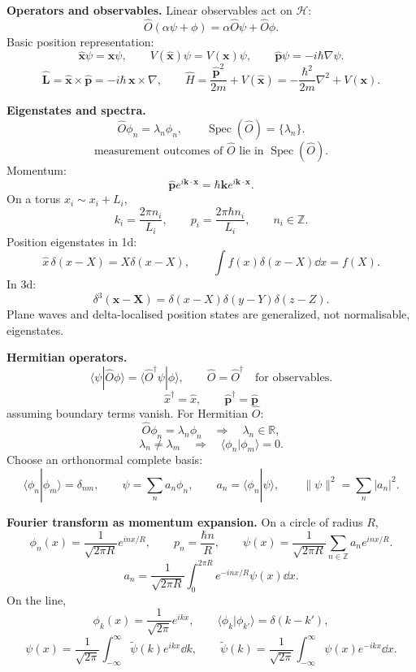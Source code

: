 \noindent\textbf{Operators and observables.}
Linear observables act on \(\mathcal{H}\):
\[
\hat O(\alpha\psi+\phi)=\alpha\hat O\psi+\hat O\phi.
\]
Basic position representation:
\[
\hat{\mathbf{x}}\psi=\mathbf{x}\psi,\qquad
V(\hat{\mathbf{x}})\psi=V(\mathbf{x})\psi,\qquad
\hat{\mathbf{p}}\psi=-i\hbar\nabla\psi.
\]
\[
\hat{\mathbf{L}}=\hat{\mathbf{x}}\times\hat{\mathbf{p}}
=-i\hbar\,\mathbf{x}\times\nabla,\qquad
\hat H=\frac{\hat{\mathbf{p}}^2}{2m}+V(\hat{\mathbf{x}})
=-\frac{\hbar^2}{2m}\nabla^2+V(\mathbf{x}).
\]

\noindent\textbf{Eigenstates and spectra.}
\[
\hat O\phi_n=\lambda_n\phi_n,\qquad
\operatorname{Spec}(\hat O)=\{\lambda_n\}.
\]
\[
\boxed{\text{measurement outcomes of }\hat O\text{ lie in }\operatorname{Spec}(\hat O)}.
\]
Momentum:
\[
\hat{\mathbf{p}}e^{i\mathbf{k}\cdot\mathbf{x}}
=\hbar\mathbf{k}e^{i\mathbf{k}\cdot\mathbf{x}}.
\]
On a torus \(x_i\sim x_i+L_i\),
\[
k_i=\frac{2\pi n_i}{L_i},\qquad p_i=\frac{2\pi\hbar n_i}{L_i},\qquad n_i\in\mathbb{Z}.
\]
Position eigenstates in 1d:
\[
\hat x\,\delta(x-X)=X\delta(x-X),\qquad
\int f(x)\delta(x-X)\dd x=f(X).
\]
In 3d:
\[
\delta^3(\mathbf{x}-\mathbf{X})
=\delta(x-X)\delta(y-Y)\delta(z-Z).
\]
Plane waves and delta-localised position states are generalized, not normalisable,
eigenstates.

\noindent\textbf{Hermitian operators.}
\[
\langle\psi|\hat O\phi\rangle=\langle\hat O^\dagger\psi|\phi\rangle,\qquad
\hat O=\hat O^\dagger\quad\text{for observables}.
\]
\[
\hat x^\dagger=\hat x,\qquad
\hat{\mathbf{p}}^\dagger=\hat{\mathbf{p}}
\]
assuming boundary terms vanish. For Hermitian \(\hat O\):
\[
\hat O\phi_n=\lambda_n\phi_n
\quad\Longrightarrow\quad
\lambda_n\in\mathbb{R},
\]
\[
\lambda_n\ne\lambda_m\quad\Longrightarrow\quad
\langle\phi_n|\phi_m\rangle=0.
\]
Choose an orthonormal complete basis:
\[
\langle\phi_n|\phi_m\rangle=\delta_{nm},\qquad
\psi=\sum_n a_n\phi_n,\qquad
a_n=\langle\phi_n|\psi\rangle,\qquad
\|\psi\|^2=\sum_n |a_n|^2.
\]

\noindent\textbf{Fourier transform as momentum expansion.}
On a circle of radius \(R\),
\[
\phi_n(x)=\frac{1}{\sqrt{2\pi R}}e^{inx/R},\qquad
p_n=\frac{\hbar n}{R},\qquad
\psi(x)=\frac{1}{\sqrt{2\pi R}}\sum_{n\in\mathbb{Z}}a_ne^{inx/R}.
\]
\[
a_n=\frac{1}{\sqrt{2\pi R}}\int_0^{2\pi R}e^{-inx/R}\psi(x)\dd x.
\]
On the line,
\[
\phi_k(x)=\frac{1}{\sqrt{2\pi}}e^{ikx},\qquad
\langle\phi_k|\phi_{k'}\rangle=\delta(k-k'),
\]
\[
\boxed{\psi(x)=\frac{1}{\sqrt{2\pi}}\int_{-\infty}^{\infty}\tilde\psi(k)e^{ikx}\dd k},\qquad
\boxed{\tilde\psi(k)=\frac{1}{\sqrt{2\pi}}\int_{-\infty}^{\infty}\psi(x)e^{-ikx}\dd x}.
\]

